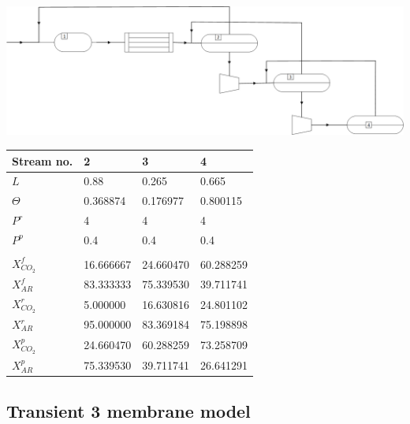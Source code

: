 \noindent\begin{minipage}{\linewidth}
	\centering
	\includegraphics[width= 1\textwidth]{Images/3membranes.png}
	\label{fig:fig3}
	
		\begin{tabular}{|llll|}
		\hline
		Stream no.    &  2        & 3         & 4         \\ \hline
		$L$           &  0.88     & 0.265     & 0.665     \\ \hline
		$\Theta$      & 0.368874  & 0.176977  & 0.800115  \\ \hline
		$P^r $        & 4         & 4         & 4         \\ \hline
		$P^p $        & 0.4       & 0.4       & 0.4       \\ \hline
					  &           &           &   		  \\ \hline		
		$X^{f}_{CO_2}$& 16.666667 & 24.660470 & 60.288259 \\ \hline 
		$X^{f}_{AR}$  & 83.333333 & 75.339530 & 39.711741 \\ \hline 
		$X^{r}_{CO_2}$& 5.000000  & 16.630816 & 24.801102 \\ \hline
		$X^{r}_{AR}$  & 95.000000 & 83.369184 & 75.198898 \\ \hline
		$X^p_{CO_2}$  & 24.660470 & 60.288259 & 73.258709 \\ \hline
		$X^p_{AR}$    & 75.339530 & 39.711741 & 26.641291 \\ \hline
		\end{tabular}
	\label{tab:table2}
\end{minipage} 

\subsection{Transient 3 membrane model}